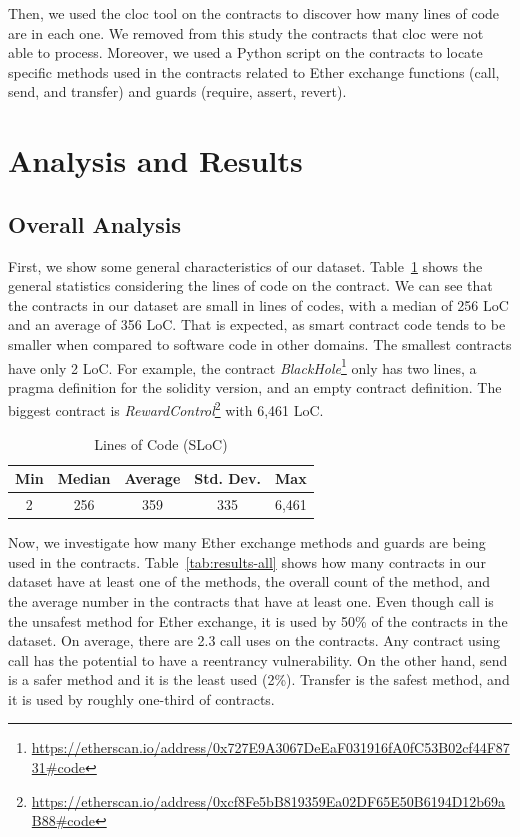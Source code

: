 \documentclass[10pt,conference]{IEEEtran}
\begin{document}
Then, we used the cloc tool on the contracts to discover how many lines of code are in each one. We removed from this study the contracts that cloc were not able to process. Moreover, we used a Python script on the contracts to locate specific methods used in the contracts related to Ether exchange functions (call, send, and transfer) and guards (require, assert, revert).

\section{Analysis and Results}

\subsection{Overall Analysis}

First, we show some general characteristics of our dataset.
Table~\ref{tab:loc} shows the general statistics considering the lines of code on the contract. We can see that the contracts in our dataset are small in lines of codes, with a median of 256 LoC and an average of 356 LoC. That is expected, as smart contract code tends to be smaller when compared to software code in other domains.  The smallest contracts have only 2 LoC.  For example, the contract \textit{BlackHole}\footnote{\url{https://etherscan.io/address/0x727E9A3067DeEaF031916fA0fC53B02cf44F8731\#code}} only has two lines, a pragma definition for the solidity version, and an empty contract definition. The biggest contract is \textit{RewardControl}\footnote{\url{https://etherscan.io/address/0xcf8Fe5bB819359Ea02DF65E50B6194D12b69aB88\#code}} with 6,461 LoC. 

\begin{table}
\center
  \caption{Lines of Code (SLoC)}
  \label{tab:loc}
  \begin{tabular}{c c c c c}
    \hline
    Min & Median & Average & Std. Dev. & Max \\
    \hline
   2 & 256 & 359 & 335 & 6,461 \\
  \hline
\end{tabular}
\end{table}

Now, we investigate how many Ether exchange methods and guards are being used in the contracts. Table~\ref{tab:results-all} shows how many contracts in our dataset have at least one of the methods, the overall count of the method, and the average number in the contracts that have at least one. Even though call is the unsafest method for Ether exchange, it is used by 50\% of the contracts in the dataset. On average, there are 2.3 call uses on the contracts. Any contract using call has the potential to have a reentrancy vulnerability. On the other hand, send is a safer method and it is the least used (2\%). Transfer is the safest method, and it is used by roughly one-third of contracts.
\end{document}
